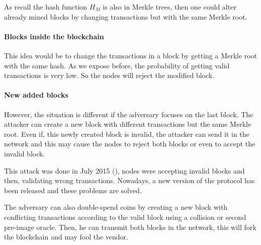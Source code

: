 As recall the hash function $H_M$ is also in Merkle trees, then one could alter already mined blocks by changing transactions but with the same Merkle root.

    \paragraph{Blocks inside the blockchain}

This idea would be to change the transactions in a block by getting a Merkle root with the same hash. As we expose before, the probability of getting valid transactions is very low. So the nodes will reject the modified block.

    \paragraph{New added blocks}

However, the situation is different if the adversary focuses on the last block. The attacker can create a new block with different transactions but the same Merkle root. Even if, this newly created block is invalid, the attacker can send it in the network and this may cause the nodes to reject both blocks or even to accept the invalid block.

This attack was done in July 2015 (\cite{mining_attack}), nodes were accepting invalid blocks and then, validating wrong transactions. Nowadays, a new version of the protocol has been released and these problems are solved. \newline

The adversary can also double-spend coins by creating a new block with conflicting transactions according to the valid block using a collision or second pre-image oracle. Then, he can transmit both blocks in the network, this will fork the blockchain and may fool the vendor.
